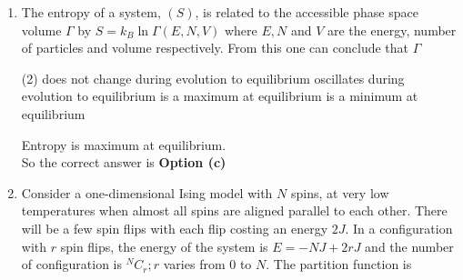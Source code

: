\begin{enumerate}
	\begin{answer}
		\begin{align*}
		\intertext{There is two normal mode so there is two degree of freedom.}
		\intertext{	Energy of harmonic oscillator is $E=\left(n_{1}+\frac{1}{2}\right) \hbar \omega_{1}+\left(n_{2}+\frac{1}{2}\right) \hbar \omega_{2}$.} E&=\left(n_{1}+\frac{1}{2}\right) \hbar \omega_{1}+\left(n_{2}+\frac{1}{2}\right) \hbar 2 \omega_{1}\text{ where } n_{1}=0,1,2,3 \ldots .
		\text{ and }n_{2}=0,1,2,3 \ldots .\\
		\intertext{	Ground state energy $E=\frac{3 \hbar \omega_{1}}{2}$, first excited state energy $E=\frac{5 \hbar \omega_{1}}{2}$. Second excited state energy $E=\frac{7 \hbar \omega_{1}}{2}$ which is doubly degenerate state so $g=2$, other state have more energy than $4 \hbar \omega_{1}$.}
		P\left(E<4 \hbar \omega_{1}\right)&=\frac{e^{-\frac{3 \beta \hbar \omega_{1}}{2}}+e^{-\frac{5 \beta \hbar \omega_{1}}{2}}+2 e^{-\frac{7 \beta \hbar \omega_{1}}{2}}}{Z}=\frac{x^{3 / 2}\left(1+x+2 x^{2}\right)}{Z}\text{ where }x=e^{-\beta \hbar \omega_{1}} .
		\end{align*}
		So the correct answer is \textbf{Option (d)}
	\end{answer}
	\item 	The entropy of a system, $(S)$, is related to the accessible phase space volume $\Gamma$ by $S=k_{B} \ln \Gamma(E, N, V)$ where $E, N$ and $V$ are the energy, number of particles and volume respectively. From this one can conclude that $\Gamma$
	{	}
	\begin{tasks}(2)
		\task[\textbf{a.}]does not change during evolution to equilibrium
		\task[\textbf{b.}]oscillates during evolution to equilibrium
		\task[\textbf{c.}]is a maximum at equilibrium
		\task[\textbf{d.}]is a minimum at equilibrium 
	\end{tasks}
	\begin{answer}
		Entropy is maximum at equilibrium.\\
		So the correct answer is \textbf{Option (c)}
	\end{answer}
	\item 	Consider a one-dimensional Ising model with $N$ spins, at very low temperatures when almost all spins are aligned parallel to each other. There will be a few spin flips with each flip costing an energy $2 J$. In a configuration with $r$ spin flips, the energy of the system is $E=-N J+2 r J$ and the number of configuration is ${ }^{N} C_{r} ; r$ varies from 0 to $N$. The partition function is

\end{enumerate}
